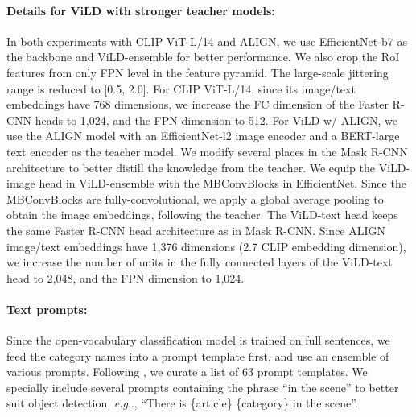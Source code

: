 \documentclass{article} \usepackage{iclr2022_conference,times}
\makeatletter
\DeclareRobustCommand\onedot{\futurelet\@let@token\@onedot}
\def\@onedot{\ifx\@let@token.\else.\null\fi\xspace}
\def\eg{\emph{e.g}\onedot} \def\Eg{\emph{E.g}\onedot}
\makeatother
\begin{document}
\paragraph{Details for ViLD with stronger teacher models:}
In both experiments with CLIP ViT-L/14 and ALIGN, we use EfficientNet-b7 as the backbone and ViLD-ensemble for better performance. 
We also crop the RoI features from only FPN level  in the feature pyramid.
The large-scale jittering range is reduced to [0.5, 2.0].
For CLIP ViT-L/14, since its image/text embeddings have 768 dimensions, we increase the FC dimension of the Faster R-CNN heads to 1,024, and the FPN dimension to 512.
For ViLD w/ ALIGN, we use the ALIGN model with an EfficientNet-l2 image encoder and a BERT-large text encoder as the teacher model.
We modify several places in the Mask R-CNN architecture to better distill the knowledge from the teacher.
We equip the ViLD-image head in ViLD-ensemble with the MBConvBlocks in EfficientNet. Since the MBConvBlocks are fully-convolutional, we apply a global average pooling to obtain the image embeddings, following the teacher.
The ViLD-text head keeps the same Faster R-CNN head architecture as in Mask R-CNN. Since ALIGN image/text embeddings have 1,376 dimensions (2.7 CLIP embedding dimension), we increase the number of units in the fully connected layers of the ViLD-text head to 2,048, and the FPN dimension to 1,024.

\paragraph{Text prompts:}
Since the open-vocabulary classification model is trained on full sentences, we feed the category names into a prompt template first, and use an ensemble of various prompts.
Following \citet{radford2021clip}, we curate a list of 63 prompt templates.
We specially include several prompts containing the phrase ``in the scene'' to better suit object detection, \eg, ``There is \{article\} \{category\} in the scene''.
\end{document}
